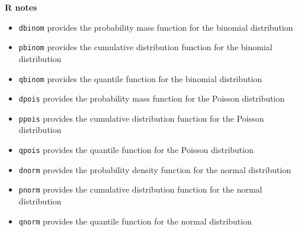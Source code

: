 \documentclass[a4paper, fleqn]{article}
\begin{document}
\noindent
\textbf{R notes} 
\begin{itemize}
  \item \texttt{dbinom} provides the probability mass function for the binomial distribution
  \item \texttt{pbinom} provides the cumulative distribution function for the binomial distribution
  \item \texttt{qbinom} provides the quantile function for the binomial distribution
  \item \texttt{dpois} provides the probability mass function for the Poisson distribution
  \item \texttt{ppois} provides the cumulative distribution function for the Poisson distribution
  \item \texttt{qpois} provides the quantile function for the Poisson distribution
  \item \texttt{dnorm} provides the probability density function for the normal distribution
  \item \texttt{pnorm} provides the cumulative distribution function for the normal distribution
  \item \texttt{qnorm} provides the quantile function for the normal distribution
\end{itemize}
\end{document}
